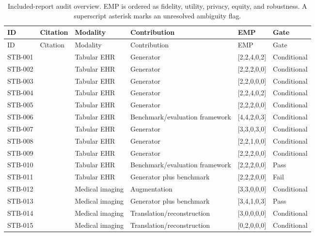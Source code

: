 \begin{longtable}{P{1.1cm}P{3.0cm}P{2.6cm}P{3.8cm}P{1.8cm}P{2.2cm}}
\caption{Included-report audit overview. EMP is ordered as fidelity, utility, privacy, equity, and robustness. A superscript asterisk marks an unresolved ambiguity flag.}\label{tab:corpusoverview}\\
\toprule
ID & Citation & Modality & Contribution & EMP & Gate \\
\midrule
\endfirsthead
\toprule
ID & Citation & Modality & Contribution & EMP & Gate \\
\midrule
\endhead
STB-001 & \citealp{jordon2019pategan} & Tabular EHR & Generator & [2,2,4,0,2] & Conditional \\
STB-002 & \citealp{torfi2020corgan} & Tabular EHR & Generator & [2,2,2,0,0] & Conditional \\
STB-003 & \citealp{beyki2021scorgan} & Tabular EHR & Generator & [2,2,0,0,0] & Conditional \\
STB-004 & \citealp{harder2021dpmerf} & Tabular EHR & Generator & [2,2,4,0,2] & Conditional \\
STB-005 & \citealp{ceritli2023tabddpmehr} & Tabular EHR & Generator & [2,2,2,0,0] & Conditional \\
STB-006 & \citealp{chen2025synthehrella} & Tabular EHR & Benchmark/evaluation framework & [4,4,2,0,3] & Conditional \\
STB-007 & \citealp{ramachandranpillai2024btgan} & Tabular EHR & Generator & [3,3,0,3,0] & Conditional \\
STB-008 & \citealp{hao2024llmsyn} & Tabular EHR & Generator & [2,2,1,0,0] & Conditional \\
STB-009 & \citealp{kotal2024contextgan} & Tabular EHR & Generator & [2,2,2,0,0] & Conditional \\
STB-010 & \citealp{hu2025synqp} & Tabular EHR & Benchmark/evaluation framework & [2,2,2,0,0] & Pass \\
STB-011 & \citealp{kita2025multimorbidity} & Tabular EHR & Generator plus benchmark & [2,2,2,0,0] & Fail \\
STB-012 & \citealp{fridadar2018livergan} & Medical imaging & Augmentation & [3,3,0,0,0] & Conditional \\
STB-013 & \citealp{costa2018retinal} & Medical imaging & Generator plus benchmark & [3,4,1,0,3] & Pass \\
STB-014 & \citealp{armanious2020medgan} & Medical imaging & Translation/reconstruction & [3,0,0,0,0] & Conditional \\
STB-015 & \citealp{shin2020gandalf} & Medical imaging & Translation/reconstruction & [0,2,0,0,0] & Conditional \\

\end{longtable}
